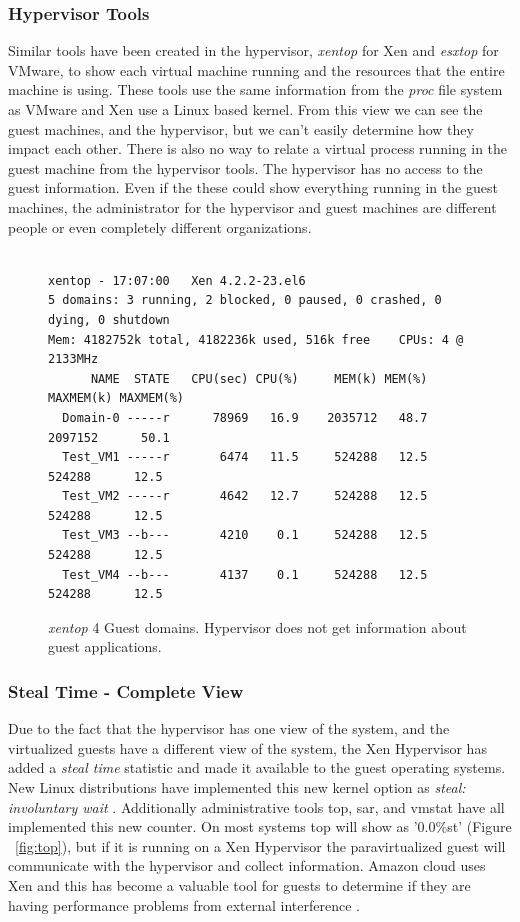 \subsubsection{Hypervisor Tools}
Similar tools have been created in the hypervisor, \emph{xentop} for Xen and \emph{esxtop} for VMware, to show each virtual machine running and the resources that the entire machine is using.  
These tools use the same information from the \emph{proc} file system as VMware and Xen use a Linux based kernel.  
From this view we can see the guest machines, and the hypervisor, but we can't easily determine how they impact each other.  There is also no way to relate a virtual process running in the guest machine from the hypervisor tools.  The hypervisor has no access to the guest information.
Even if the these could show everything running in the guest machines, the administrator for the hypervisor and guest machines are different people or even completely different organizations. 

\begin{figure}[h]
\begingroup
    \fontsize{10pt}{12pt}\selectfont
\begin{Verbatim}

xentop - 17:07:00   Xen 4.2.2-23.el6
5 domains: 3 running, 2 blocked, 0 paused, 0 crashed, 0 dying, 0 shutdown
Mem: 4182752k total, 4182236k used, 516k free    CPUs: 4 @ 2133MHz
      NAME  STATE   CPU(sec) CPU(%)     MEM(k) MEM(%)  MAXMEM(k) MAXMEM(%) 
  Domain-0 -----r      78969   16.9    2035712   48.7    2097152      50.1    
  Test_VM1 -----r       6474   11.5     524288   12.5     524288      12.5     
  Test_VM2 -----r       4642   12.7     524288   12.5     524288      12.5 
  Test_VM3 --b---       4210    0.1     524288   12.5     524288      12.5     
  Test_VM4 --b---       4137    0.1     524288   12.5     524288      12.5  
\end{Verbatim}
\endgroup
\caption{\emph{xentop} 4 Guest domains. Hypervisor does not get information about guest applications.}
\label{fig:xentop}
\end{figure}

\subsubsection{Steal Time - Complete View}
Due to the fact that the hypervisor has one view of the system, and the virtualized guests have a different view of the system, the Xen Hypervisor has added a \emph{steal time} statistic and made it available to the guest operating systems.  New Linux distributions have implemented this new kernel option as \emph{steal: involuntary wait} \cite{proc}.  Additionally administrative tools top, sar, and vmstat have all implemented this new counter.  
On most systems top will show as '0.0\%st' (Figure ~\ref{fig:top}), but if it is running on a Xen Hypervisor the paravirtualized guest will communicate with the hypervisor and collect information. Amazon cloud uses Xen and this has become a valuable tool for guests to determine if they are having performance problems from external interference \cite{netflix}.

